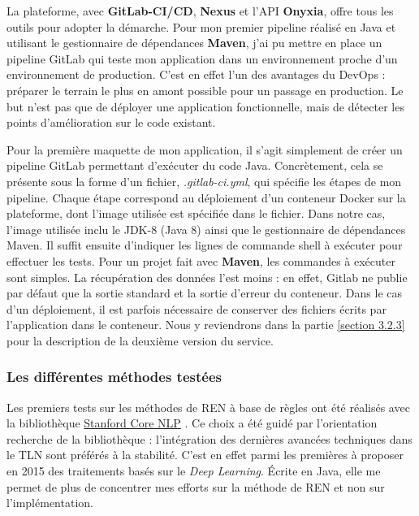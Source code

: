 La plateforme, avec \textbf{GitLab-CI/CD}, \textbf{Nexus} et l'API \textbf{Onyxia}, offre tous les outils pour adopter la démarche. Pour mon premier pipeline réalisé en Java et utilisant le gestionnaire de dépendances \textbf{Maven}, j'ai pu mettre en place un pipeline GitLab qui teste mon application dans un environnement proche d'un environnement de production. C'est en effet l'un des avantages du DevOps : préparer le terrain le plus en amont possible pour un passage en production. Le but n'est pas que de déployer une application fonctionnelle, mais de détecter les points d'amélioration sur le code existant. 
\newline

Pour la première maquette de mon application, il s'agit simplement de créer un pipeline GitLab permettant d'exécuter du code Java. Concrètement, cela se présente sous la forme d'un fichier, \textit{.gitlab-ci.yml}, qui spécifie les étapes de mon pipeline. Chaque étape correspond au déploiement d'un conteneur Docker sur la plateforme, dont l'image utilisée est spécifiée dans le fichier. Dans notre cas, l'image utilisée inclu le JDK-8 (Java 8) ainsi que le gestionnaire de dépendances Maven. Il suffit ensuite d'indiquer les lignes de commande shell à exécuter pour effectuer les tests. Pour un projet fait avec \textbf{Maven}, les commandes à exécuter sont simples. La récupération des données l'est moins : en effet, Gitlab ne publie par défaut que la sortie standard et la sortie d'erreur du conteneur. Dans le cas d'un déploiement, il est parfois nécessaire de conserver des fichiers écrits par l'application dans le conteneur. Nous y reviendrons dans la partie \ref{section 3.2.3} pour la description de la deuxième version du service.
\label{section 2.2.3}

\subsubsection{Les différentes méthodes testées}
Les premiers tests sur les méthodes de REN à base de règles ont été réalisés avec la bibliothèque \href{https://stanfordnlp.github.io/CoreNLP/}{Stanford Core NLP} \cite{corenlp-doc}. Ce choix a été guidé par l'orientation recherche de la bibliothèque : l'intégration des dernières avancées techniques dans le TLN sont préférés à la stabilité. C'est en effet parmi les premières à proposer en 2015 des traitements basés sur le \textit{Deep Learning}. Écrite en Java, elle me permet de plus de concentrer mes efforts sur la méthode de REN et non sur l'implémentation. 
\newline

